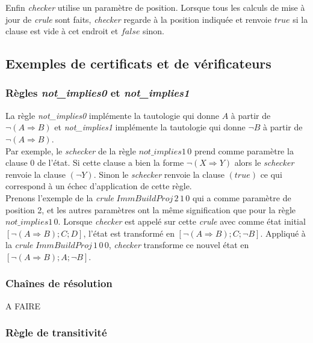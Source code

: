 \documentclass[11pt]{article}
\begin{document}
Enfin \textit{checker} utilise un paramètre de position. Lorsque tous les calculs de mise à jour de \textit{crule} sont faits, \textit{checker} regarde à la position indiquée et renvoie $true$ si la clause est vide à cet endroit et $false$ sinon.

\subsection{Exemples de certificats et de vérificateurs}

\subsubsection{Règles \textit{not\_implies0} et \textit{not\_implies1}}
La règle \textit{not\_implies0} implémente la tautologie qui donne $A$ à partir de $\neg (A \Rightarrow B)$ et \textit{not\_implies1} implémente la tautologie qui donne $\neg B$ à partir de $\neg (A \Rightarrow B)$. \\

Par exemple, le \textit{schecker} de la règle $not\_implies1 \, 0$ prend comme paramètre la clause $0$ de l'état. Si cette clause a bien la forme $ \neg (X \Rightarrow Y)$ alors le \textit{schecker} renvoie la clause $(\neg Y)$. Sinon le \textit{schecker} renvoie la clause $(true)$ ce qui correspond à un échec d'application de cette règle. \\

Prenons l'exemple de la \textit{crule} $ImmBuildProj \, 2 \, 1 \, 0$ qui a comme paramètre de position 2, et les autres paramètres ont la même signification que pour la règle  $not\_implies1 \, 0$. Lorsque \textit{checker} est appelé sur cette \textit{crule} avec comme état initial  $[\neg (A \Rightarrow B);  C; D]$, l'état est transformé en $[\neg (A \Rightarrow B);  C; \neg B]$. Appliqué à la \textit{crule} $ImmBuildProj \, 1 \, 0 \, 0$, \textit{checker} transforme ce nouvel état en $[\neg (A \Rightarrow B);  A; \neg B]$. 

\subsubsection{Chaînes de résolution}

A FAIRE

\subsubsection{Règle de transitivité}
\end{document}
